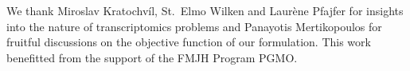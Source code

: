 \documentclass{ecai}
\begin{document}

\begin{ack}
We thank Miroslav Kratochvíl, St.~Elmo Wilken and Laurène Pfajfer for insights into the nature of transcriptomics problems and Panayotis Mertikopoulos for fruitful discussions on the objective function of our formulation.
This work benefitted from the support of the FMJH Program PGMO.
\end{ack}

\clearpage

\end{document}
